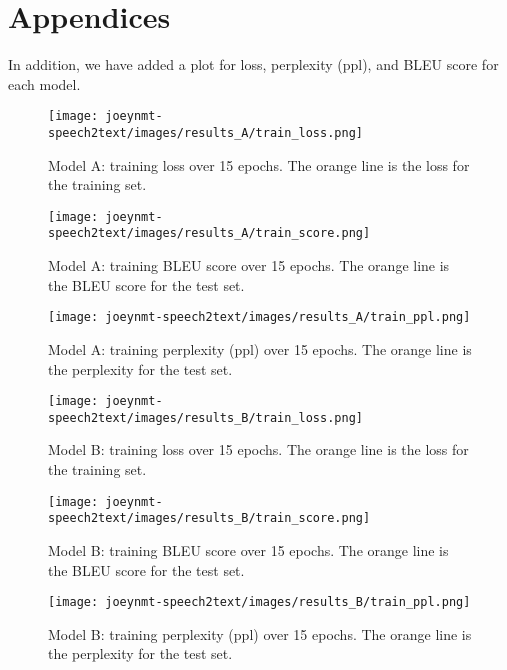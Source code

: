 \documentclass[11pt,a4paper]{article}
\begin{document}



\appendix

\section{Appendices}

In addition, we have added a plot for loss, perplexity (ppl), and BLEU score for each model.

\begin{figure}[ht]
    \centering
    \texttt{[image: joeynmt-speech2text/images/results\_A/train\_loss.png]}
    \caption{Model A: training loss over 15 epochs. The orange line is the loss for the training set.}
    \label{fig:train_loss_a}
\end{figure}

\begin{figure}[ht]
    \centering
    \texttt{[image: joeynmt-speech2text/images/results\_A/train\_score.png]}
    \caption{Model A: training BLEU score over 15 epochs. The orange line is the BLEU score for the test set.}
    \label{fig:train_score_a}
\end{figure}

\begin{figure}[ht]
    \centering
    \texttt{[image: joeynmt-speech2text/images/results\_A/train\_ppl.png]}
    \caption{Model A: training perplexity (ppl) over 15 epochs. The orange line is the perplexity for the test set.}
    \label{fig:train_ppl_a}
\end{figure}

\begin{figure}[ht]
    \centering
    \texttt{[image: joeynmt-speech2text/images/results\_B/train\_loss.png]}
    \caption{Model B: training loss over 15 epochs. The orange line is the loss for the training set.}
    \label{fig:train_loss_b}
\end{figure}

\begin{figure}[ht]
    \centering
    \texttt{[image: joeynmt-speech2text/images/results\_B/train\_score.png]}
    \caption{Model B: training BLEU score over 15 epochs. The orange line is the BLEU score for the test set.}
    \label{fig:train_score_b}
\end{figure}

\begin{figure}[ht]
    \centering
    \texttt{[image: joeynmt-speech2text/images/results\_B/train\_ppl.png]}
    \caption{Model B: training perplexity (ppl) over 15 epochs. The orange line is the perplexity for the test set.}
    \label{fig:train_ppl_b}
\end{figure}
\end{document}
